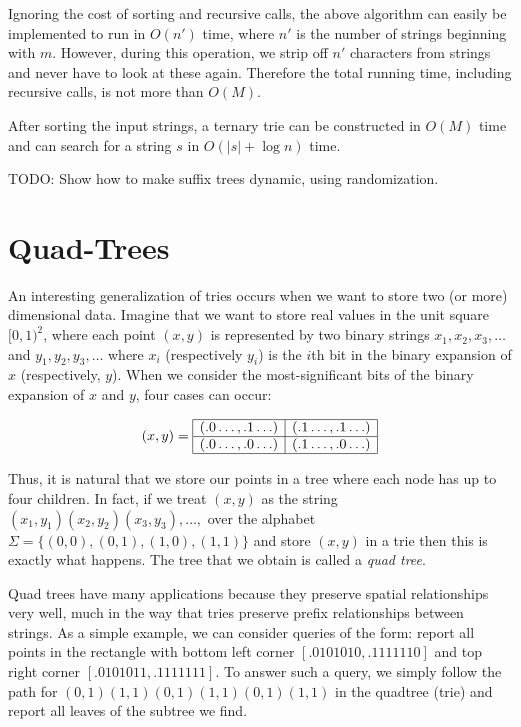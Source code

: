 Ignoring the cost of sorting and recursive calls, the above algorithm
can easily be implemented to run in $O(n')$ time, where $n'$ is the
number of strings beginning with $m$.  However, during this operation,
we strip off $n'$ characters from strings and never have to look at
these again.  Therefore the total running time, including recursive
calls, is not more than $O(M)$.

\begin{thm}
After sorting the input strings, a ternary trie can be constructed in
$O(M)$ time and can search for a string $s$ in $O(|s|+\log n)$ time.
\end{thm}

TODO: Show how to make suffix trees dynamic, using randomization.

\section{Quad-Trees}

An interesting generalization of tries occurs when we want to store
two (or more) dimensional data.  Imagine that we want to store real
values in the unit square $[0,1)^2$, where each point $(x,y)$ is
represented by two binary strings $x_1,x_2,x_3,\ldots$ and
$y_1,y_2,y_3,\ldots$ where $x_i$ (respectively $y_i$) is the
$i$th bit in the binary expansion of $x$ (respectively, $y$).  When we
consider the most-significant bits of the binary expansion of $x$ and
$y$, four cases can occur:


\[(x,y) = \begin{array}{|c|c|}\hline
(.0\ldots,.1\ldots) & (.1\ldots,.1\ldots) \\ \hline
(.0\ldots,.0\ldots) & (.1\ldots,.0\ldots) \\ \hline
\end{array}
\]

Thus, it is natural that we store our points in a tree where each node
has up to four children.  In fact, if we treat $(x,y)$ as the string
$(x_1,y_1)(x_2,y_2)(x_3,y_3),\ldots,$ over the alphabet
$\Sigma=\{(0,0),(0,1),(1,0),(1,1)\}$ and store $(x,y)$ in a trie then
this is exactly what happens.  The tree that we obtain is called a
\emph{quad tree}.

Quad trees have many applications because they preserve spatial
relationships very well, much in the way that tries preserve prefix
relationships between strings.  As a simple example, we can consider
queries of the form: report all points in the rectangle with bottom
left corner $[.0101010,.1111110]$ and top right corner
$[.0101011,.1111111]$.  To answer such a query, we simply follow the
path for $(0,1)(1,1)(0,1)(1,1)(0,1)(1,1)$ in the quadtree (trie) and
report all leaves of the subtree we find.


